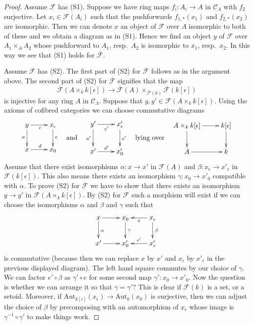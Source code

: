 \documentclass{stacks-project}
\theoremstyle{plain}
\theoremstyle{definition}
\theoremstyle{remark}
\numberwithin{equation}{subsection}
\begin{document}
\begin{proof}
Assume $\mathcal{F}$ has (S1).
Suppose we have ring maps $f_i : A_i \to A$ in $\mathcal{C}_\Lambda$
with $f_2$ surjective. Let $x_i \in \mathcal{F}(A_i)$ such that
the pushforwards $f_{1, *}(x_1)$ and $f_{2, *}(x_2)$ are isomorphic.
Then we can denote $x$ an object of $\mathcal{F}$ over $A$ isomorphic
to both of these and we obtain a diagram as in (S1). Hence we find
an object $y$ of $\mathcal{F}$ over $A_1 \times_A A_2$ whose pushforward
to $A_1$, resp.\ $A_2$ is isomorphic to $x_1$, resp.\ $x_2$. In this way
we see that (S1) holds for $\overline{\mathcal{F}}$.

\medskip\noindent
Assume $\mathcal{F}$ has (S2).
The first part of (S2) for $\overline{\mathcal{F}}$ follows as in
the argument above. The second part of (S2) for
$\overline{\mathcal{F}}$ signifies that the map
$$
\overline{\mathcal{F}}(A \times_k k[\epsilon]) \to
\overline{\mathcal{F}}(A)
\times_{\overline{\mathcal{F}}(k)} \overline{\mathcal{F}}(k[\epsilon])
$$
is injective for any ring $A$ in $\mathcal{C}_\Lambda$. Suppose that
$y, y' \in \mathcal{F}(A \times_k k[\epsilon])$. Using the axioms
of cofibred categories we can choose commutative diagrams
$$
\vcenter{
\xymatrix{
y \ar[r]_c \ar[d]_a & x_\epsilon \ar[d]^e \\
x \ar[r]^d          & x_0
}
}
\quad\text{and}\quad
\vcenter{
\xymatrix{
y' \ar[r]_{c'} \ar[d]_{a'} & x'_\epsilon \ar[d]^{e'} \\
x' \ar[r]^{d'}                 & x'_0
}
}
\quad\text{lying over}\quad
\vcenter{
\xymatrix{
A \times_k k[\epsilon] \ar[d] \ar[r] & k[\epsilon] \ar[d] \\
A \ar[r] & k
}
}
$$
Assume that there exist isomorphisms
$\alpha : x \to x'$ in $\mathcal{F}(A)$ and
$\beta : x_\epsilon \to x'_\epsilon$ in $\mathcal{F}(k[\epsilon])$.
This also means there exists an isomorphism $\gamma : x_0 \to x'_0$
compatible with $\alpha$. To prove (S2) for $\overline{\mathcal{F}}$
we have to show that there exists an isomorphism $y \to y'$ in
$\mathcal{F}(A \times_k k[\epsilon])$.
By (S2) for $\mathcal{F}$ such a morphism will exist if we can
choose the isomorphisms $\alpha$ and $\beta$ and $\gamma$ such that
$$
\xymatrix{
x \ar[d]^\alpha \ar[r] & x_0 \ar[d]^\gamma &
x_\epsilon \ar[d]^\beta \ar[l]^e \\
x' \ar[r] & x'_0 & x'_\epsilon \ar[l]_{e'}
}
$$
is commutative (because then we can replace $x$ by $x'$ and $x_\epsilon$
by $x'_\epsilon$ in the previous displayed diagram). The left hand square
commutes by our choice of $\gamma$. We can factor $e' \circ \beta$ as
$\gamma' \circ e$ for some second map
$\gamma' : x_0 \to x'_0$. Now the question is whether we can arrange it so
that $\gamma = \gamma'$? This is clear if $\mathcal{F}(k)$ is a set, or a
setoid. Moreover, if
$\text{Aut}_{k[\epsilon]}(x_\epsilon) \to \text{Aut}_k(x_0)$
is surjective, then we can adjust the choice of $\beta$ by precomposing
with an automorphism of $x_\epsilon$ whose image is
$\gamma^{-1} \circ \gamma'$ to make things work.
\end{proof}
\end{document}
